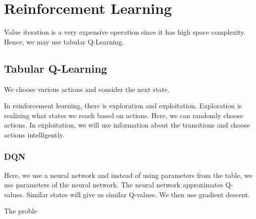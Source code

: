 \chapter{Reinforcement Learning}

Value iteration is a very expensive operation since it has high space complexity. Hence, we may use tabular Q-Learning. 

\section{Tabular Q-Learning}

We choose various actions and consider the next state.

In reinforcement learning, there is exploration and exploitation. Exploration is realizing what states we reach based on actions. Here, we can randomly choose actions. In exploitation, we will use information about the transitions and choose actions intelligently. 
\subsection{DQN}

Here, we use a neural network and instead of using parameters from the table, we use parameters of the neural network. The neural network approximates Q-values. Similar states will give us similar Q-values. We then use gradient descent.

The proble